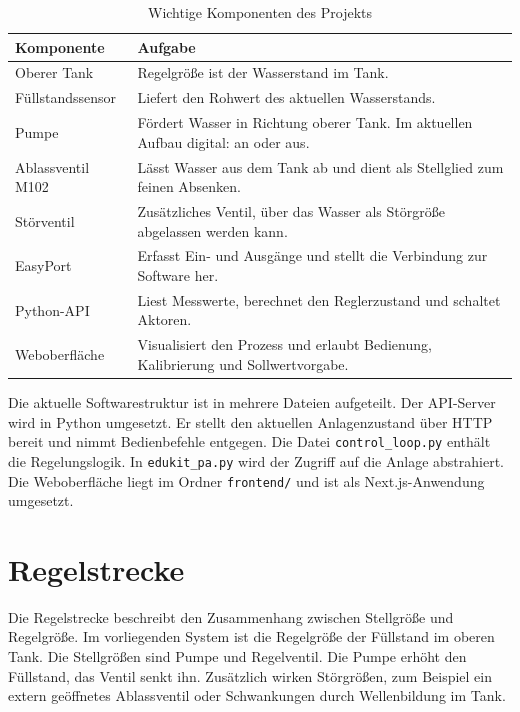 \documentclass[12pt,a4paper]{scrartcl}
\begin{document}
\begin{table}[H]
  \centering
  \caption{Wichtige Komponenten des Projekts}
  \begin{tabularx}{\textwidth}{lX}
    \toprule
    Komponente & Aufgabe\\
    \midrule
    Oberer Tank & Regelgröße ist der Wasserstand im Tank.\\
    Füllstandssensor & Liefert den Rohwert des aktuellen Wasserstands.\\
    Pumpe & Fördert Wasser in Richtung oberer Tank. Im aktuellen Aufbau digital: an oder aus.\\
    Ablassventil M102 & Lässt Wasser aus dem Tank ab und dient als Stellglied zum feinen Absenken.\\
    Störventil & Zusätzliches Ventil, über das Wasser als Störgröße abgelassen werden kann.\\
    EasyPort & Erfasst Ein- und Ausgänge und stellt die Verbindung zur Software her.\\
    Python-API & Liest Messwerte, berechnet den Reglerzustand und schaltet Aktoren.\\
    Weboberfläche & Visualisiert den Prozess und erlaubt Bedienung, Kalibrierung und Sollwertvorgabe.\\
    \bottomrule
  \end{tabularx}
\end{table}

Die aktuelle Softwarestruktur ist in mehrere Dateien aufgeteilt. Der API-Server wird in Python umgesetzt. Er stellt den aktuellen Anlagenzustand über HTTP bereit und nimmt Bedienbefehle entgegen. Die Datei \texttt{control\_loop.py} enthält die Regelungslogik. In \texttt{edukit\_pa.py} wird der Zugriff auf die Anlage abstrahiert. Die Weboberfläche liegt im Ordner \texttt{frontend/} und ist als Next.js-Anwendung umgesetzt.

\section{Regelstrecke}

Die Regelstrecke beschreibt den Zusammenhang zwischen Stellgröße und Regelgröße. Im vorliegenden System ist die Regelgröße der Füllstand im oberen Tank. Die Stellgrößen sind Pumpe und Regelventil. Die Pumpe erhöht den Füllstand, das Ventil senkt ihn. Zusätzlich wirken Störgrößen, zum Beispiel ein extern geöffnetes Ablassventil oder Schwankungen durch Wellenbildung im Tank.
\end{document}
